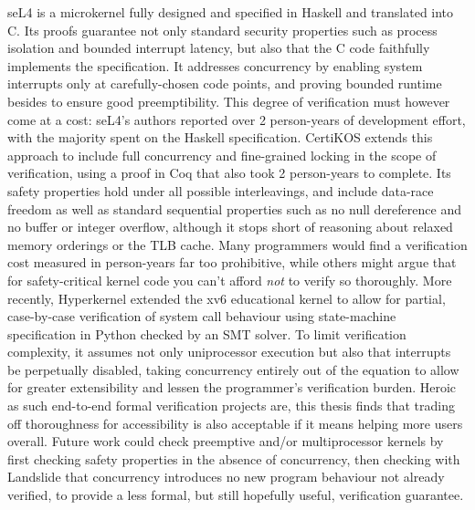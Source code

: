 seL4 \cite{sel4} is a microkernel fully designed and specified in Haskell and translated into C.
Its proofs guarantee not only standard security properties such as process isolation and bounded interrupt latency,
but also that the C code faithfully implements the specification.
It addresses concurrency by enabling system interrupts only at carefully-chosen code points,
and proving bounded runtime besides to ensure good preemptibility.
This degree of verification must however come at a cost:
seL4's authors reported over 2 person-years of development effort, with the majority spent on the Haskell specification.
%
CertiKOS \cite{certikos} extends this approach to include full concurrency and fine-grained locking
in the scope of verification,
using a proof in Coq that also took 2 person-years to complete.
Its safety properties hold under all possible interleavings,
and include data-race freedom as well as standard sequential properties
such as no null dereference and no buffer or integer overflow,
although it stops short of reasoning about relaxed memory orderings or the TLB cache.
Many programmers would find a verification cost measured in person-years far too prohibitive,
while others might argue that for safety-critical kernel code you can't afford {\em not} to verify so thoroughly.
%
More recently, Hyperkernel \cite{hyperkernel} extended the xv6 educational kernel \cite{xv6}
to allow for partial, case-by-case verification of system call behaviour using state-machine specification in Python
checked by an SMT solver.
To limit verification complexity, it assumes not only uniprocessor execution
but also that interrupts be perpetually disabled,
taking concurrency entirely out of the equation to allow for greater extensibility
and lessen the programmer's verification burden.
%
Heroic as such end-to-end formal verification projects are,
this thesis finds that trading off thoroughness for accessibility is also acceptable
if it means helping more users overall.
Future work could check preemptive and/or multiprocessor kernels
by first checking safety properties in the absence of concurrency,
then checking with Landslide that concurrency introduces no new program behaviour not already verified,
to provide a less formal, but still hopefully useful, verification guarantee.
